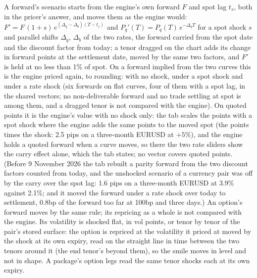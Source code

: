 \documentclass[11pt,a4paper]{article}
\begin{document}
A forward's scenario starts from the engine's own forward $F$ and spot lag $t_s$, both in the pricer's answer, and moves them as the engine would: $F'=F\,(1+s)\,e^{(\Delta_q-\Delta_b)(T-t_s)}$ and $P_q'(T)=P_q(T)\,e^{-\Delta_q T}$ for a spot shock $s$ and parallel shifts $\Delta_q$, $\Delta_b$ of the two rates, the forward carried from the spot date and the discount factor from today; a tenor dragged on the chart adds its change in forward points at the settlement date, moved by the same two factors, and $F'$ is held at no less than 1\% of spot. On a forward implied from the two curves this is the engine priced again, to rounding: with no shock, under a spot shock and under a rate shock (six forwards on flat curves, four of them with a spot lag, in the shared vectors; no non-deliverable forward and no trade settling at spot is among them, and a dragged tenor is not compared with the engine). On quoted points it is the engine's value with no shock only: the tab scales the points with a spot shock where the engine adds the same points to the moved spot (the points times the shock: 2.5 pips on a three-month EURUSD at $+5\%$), and the engine holds a quoted forward when a curve moves, so there the two rate sliders show the carry effect alone, which the tab states; no vector covers quoted points. (Before 9 November 2026 the tab rebuilt a parity forward from the two discount factors counted from today, and the unshocked scenario of a currency pair was off by the carry over the spot lag: 1.6 pips on a three-month EURUSD at 3.9\% against 2.1\%; and it moved the forward under a rate shock over today to settlement, 0.8bp of the forward too far at 100bp and three days.) An option's forward moves by the same rule; its repricing as a whole is not compared with the engine. Its volatility is shocked flat, in vol points, or tenor by tenor of the pair's stored surface: the option is repriced at the volatility it priced at moved by the shock at its own expiry, read on the straight line in time between the two tenors around it (the end tenor's beyond them), so the smile moves in level and not in shape. A package's option legs read the same tenor shocks each at its own expiry.
\end{document}

